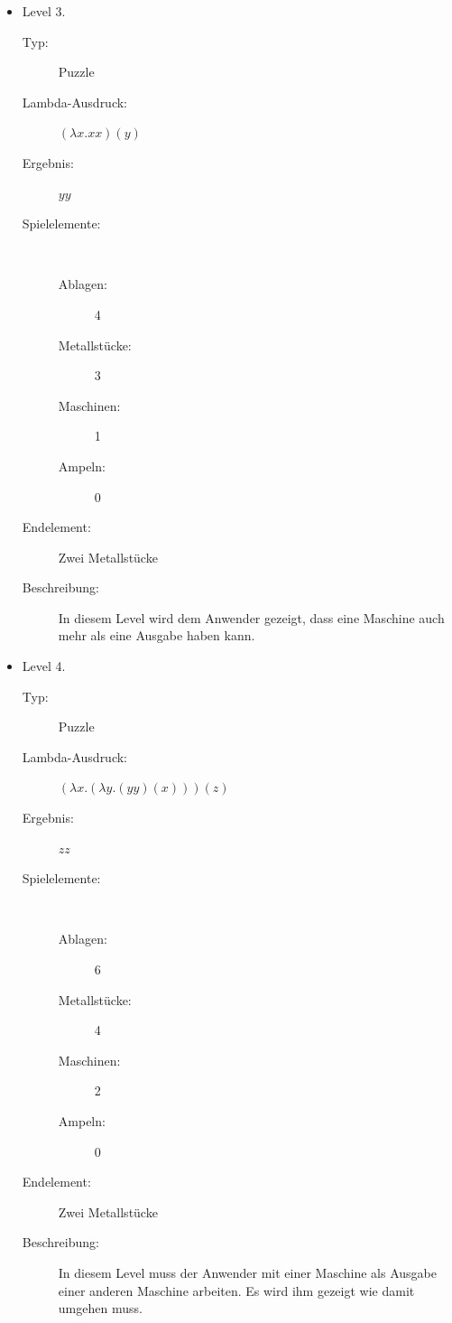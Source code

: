 \documentclass[11pt,a4paper]{report}
\begin{document}
\begin{itemize}
	\item{Level 3.}
	\begin{description}
		\item[Typ:] Puzzle
		\item[Lambda-Ausdruck:] $(\lambda x.x x)(y)$
		\item[Ergebnis:]$yy$
		\item[Spielelemente:]\ \linebreak[1]
		\begin{description}
			\item[Ablagen: ]4
			\item[Metallstücke: ]3
			\item[Maschinen: ]1
			\item[Ampeln: ]0
		\end{description}	
		\item[Endelement:] Zwei Metallstücke
		\item[Beschreibung:] In diesem Level wird dem Anwender gezeigt, dass eine Maschine auch mehr als eine Ausgabe haben kann.
	\end{description}
	
	\item{Level 4.}
	\begin{description}
		\item[Typ:] Puzzle
		\item[Lambda-Ausdruck:] $(\lambda x.(\lambda y.(yy)(x)))(z)$
		\item[Ergebnis:]$zz$
		\item[Spielelemente:]\ \linebreak[1]
		\begin{description}
			\item[Ablagen: ]6
			\item[Metallstücke: ]4
			\item[Maschinen: ]2
			\item[Ampeln: ]0
		\end{description}	
		\item[Endelement:] Zwei Metallstücke
		\item[Beschreibung:] In diesem Level muss der Anwender mit einer Maschine als Ausgabe einer anderen Maschine arbeiten. Es wird ihm gezeigt wie damit umgehen muss.
	\end{description}
	

\end{itemize}
\end{document}
